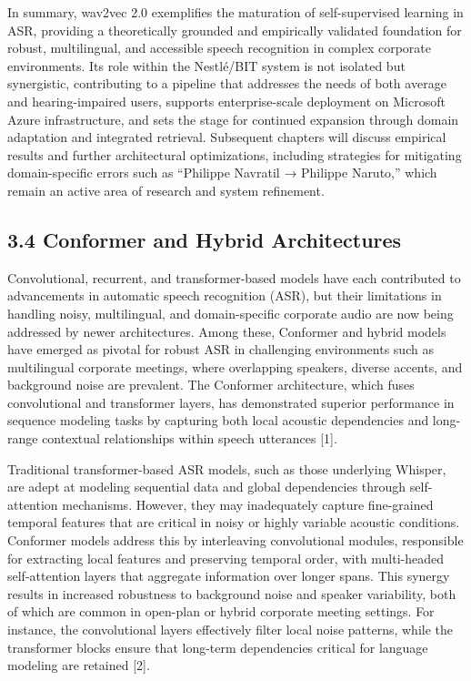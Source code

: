 \documentclass[12pt,a4paper]{article}
\begin{document}
In summary, wav2vec 2.0 exemplifies the maturation of self-supervised learning in ASR, providing a theoretically grounded and empirically validated foundation for robust, multilingual, and accessible speech recognition in complex corporate environments. Its role within the Nestlé/BIT system is not isolated but synergistic, contributing to a pipeline that addresses the needs of both average and hearing-impaired users, supports enterprise-scale deployment on Microsoft Azure infrastructure, and sets the stage for continued expansion through domain adaptation and integrated retrieval. Subsequent chapters will discuss empirical results and further architectural optimizations, including strategies for mitigating domain-specific errors such as “Philippe Navratil → Philippe Naruto,” which remain an active area of research and system refinement.


\subsection{3.4 Conformer and Hybrid Architectures}


Convolutional, recurrent, and transformer-based models have each contributed to advancements in automatic speech recognition (ASR), but their limitations in handling noisy, multilingual, and domain-specific corporate audio are now being addressed by newer architectures. Among these, Conformer and hybrid models have emerged as pivotal for robust ASR in challenging environments such as multilingual corporate meetings, where overlapping speakers, diverse accents, and background noise are prevalent. The Conformer architecture, which fuses convolutional and transformer layers, has demonstrated superior performance in sequence modeling tasks by capturing both local acoustic dependencies and long-range contextual relationships within speech utterances [1].


Traditional transformer-based ASR models, such as those underlying Whisper, are adept at modeling sequential data and global dependencies through self-attention mechanisms. However, they may inadequately capture fine-grained temporal features that are critical in noisy or highly variable acoustic conditions. Conformer models address this by interleaving convolutional modules, responsible for extracting local features and preserving temporal order, with multi-headed self-attention layers that aggregate information over longer spans. This synergy results in increased robustness to background noise and speaker variability, both of which are common in open-plan or hybrid corporate meeting settings. For instance, the convolutional layers effectively filter local noise patterns, while the transformer blocks ensure that long-term dependencies critical for language modeling are retained [2].
\end{document}

